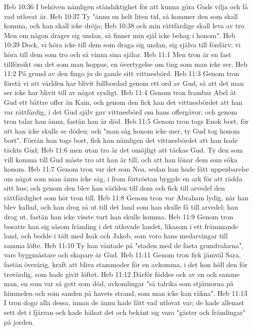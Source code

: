 Heb 10:36  I behöven nämligen ståndaktighet för att kunna göra Guds vilja och få vad utlovat är.
Heb 10:37  Ty "ännu en helt liten tid, så kommer den som skall komma, och han skall icke dröja;
Heb 10:38  och min rättfärdige skall leva av tro. Men om någon drager sig undan, så finner min själ icke behag i honom".
Heb 10:39  Dock, vi höra icke till dem som draga sig undan, sig själva till fördärv; vi höra till dem som tro och så vinna sina själar.
Heb 11:1  Men tron är en fast tillförsikt om det som man hoppas, en övertygelse om ting som man icke ser.
Heb 11:2  På grund av den fingo ju de gamle sitt vittnesbörd.
Heb 11:3  Genom tron förstå vi att världen har blivit fullbordad genom ett ord av Gud, så att det man ser icke har blivit till av något synligt.
Heb 11:4  Genom tron frambar Abel åt Gud ett bättre offer än Kain, och genom den fick han det vittnesbördet att han var rättfärdig, i det Gud själv gav vittnesbörd om hans offergåvor; och genom tron talar han ännu, fastän han är död.
Heb 11:5  Genom tron togs Enok bort, för att han icke skulle se döden; och "man såg honom icke mer, ty Gud tog honom bort". Förrän han togs bort, fick han nämligen det vittnesbördet att han hade täckts Gud;
Heb 11:6  men utan tro är det omöjligt att täckas Gud. Ty den som vill komma till Gud måste tro att han är till, och att han lönar dem som söka honom.
Heb 11:7  Genom tron var det som Noa, sedan han hade fått uppenbarelse om något som man ännu icke såg, i from förtröstan byggde en ark för att rädda sitt hus; och genom den blev han världen till dom och fick till arvedel den rättfärdighet som hör tron till.
Heb 11:8  Genom tron var Abraham lydig, när han blev kallad, och han drog så ut till det land som han skulle få till arvedel; han drog ut, fastän han icke visste vart han skulle komma.
Heb 11:9  Genom tron bosatte han sig såsom främling i det utlovade landet, likasom i ett främmande land, och bodde i tält med Isak och Jakob, som voro hans medarvingar till samma löfte.
Heb 11:10  Ty han väntade på "staden med de fasta grundvalarna", vars byggmästare och skapare är Gud.
Heb 11:11  Genom tron fick jämväl Sara, fastän överårig, kraft att bliva stammoder för en avkomma, i det hon höll den för trovärdig, som hade givit löftet.
Heb 11:12  Därför föddes ock av en och samme man, en som var så gott som död, avkomlingar "så talrika som stjärnorna på himmelen och som sanden på havets strand, som man icke kan räkna".
Heb 11:13  I tron dogo alla dessa, innan de ännu hade fått vad utlovat var; de hade allenast sett det i fjärran och hade hälsat det och bekänt sig vara "gäster och främlingar" på jorden.
